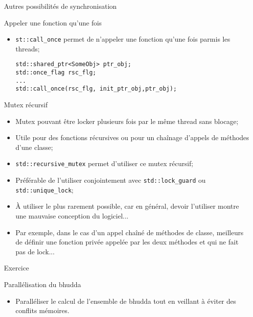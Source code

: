 \documentclass[handout,10pt]{beamer}
\begin{document}
\begin{frame}[fragile]{Autres possibilités de synchronisation}
\tiny
\begin{block}{Appeler une fonction qu'une fois}
\begin{itemize}
 \item \lstinline$st::call_once$ permet de n'appeler une fonction qu'une fois parmis les threads;
\begin{lstlisting}
std::shared_ptr<SomeObj> ptr_obj;
std::once_flag rsc_flg;
...
std::call_once(rsc_flg, init_ptr_obj,ptr_obj);
\end{lstlisting}
\end{itemize}
\end{block}

\begin{block}{Mutex récursif}
 \begin{itemize}
  \item Mutex pouvant être locker plusieurs fois par le même thread sans blocage;
  \item Utile pour des fonctions récursives ou pour un chaînage d'appels de méthodes d'une classe;
  \item \lstinline$std::recursive_mutex$ permet d'utiliser ce mutex récursif;
  \item Préférable de l'utiliser conjointement avec \lstinline$std::lock_guard$ ou \lstinline$std::unique_lock$;
  \item À utiliser le plus rarement possible, car en général, devoir l'utiliser montre une mauvaise conception
  du logiciel...
  \item Par exemple, dans le cas d'un appel chaîné de méthodes de classe, meilleurs de définir une fonction privée
  appelée par les deux méthodes et qui ne fait pas de lock...
 \end{itemize}
\end{block}
\end{frame}

\begin{frame}[fragile]{Exercice}
\tiny
\begin{exampleblock}{Parallélisation du bhudda}
\begin{itemize}
\item Paralléliser le calcul de l'ensemble de bhudda tout en veillant à éviter des conflits mémoires.
\end{itemize}
\end{exampleblock}
\end{frame}
\end{document}
